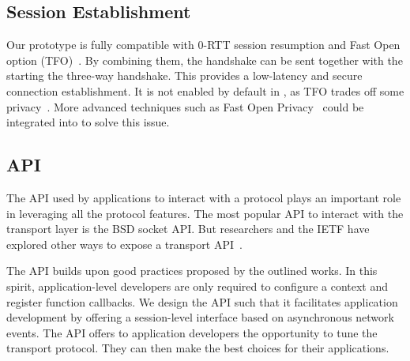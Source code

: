 \subsection{\tcpls Session Establishment}

Our prototype is fully compatible with  0-RTT session resumption
and \tcp Fast Open option (TFO)~\cite{radhakrishnan2011tcp}. By combining them,
the \tcpls handshake can be sent together with the \tcp \syn starting
the three-way handshake. This provides a low-latency and secure connection establishment. It is not enabled by default in \tcpls, as TFO trades off some privacy~\cite{sy2020enhanced}. More advanced techniques such as \tcp Fast Open Privacy~\cite{sy2020enhanced} could be integrated into \tcpls to solve this issue.

\subsection{\tcpls API}
\label{sec-api}

The API used by applications to interact with a protocol plays an important role in leveraging all the protocol features. The most popular API to interact with the transport layer is the BSD socket API. But researchers and the IETF have explored other ways to expose a transport API~\cite{draft-ietf-taps-arch,hruby2014sockets,rfc6458,schmidt2013socket}.

The \tcpls API builds upon good practices proposed by the outlined works.
In this spirit, application-level developers are only required to configure a \tcpls context and register function callbacks. We design the \tcpls API such
that %
it facilitates application development by offering a %
session-level interface based on asynchronous network events. The \tcpls API 
offers to application developers the opportunity to tune the transport 
protocol. They can then make the best choices for their applications.

